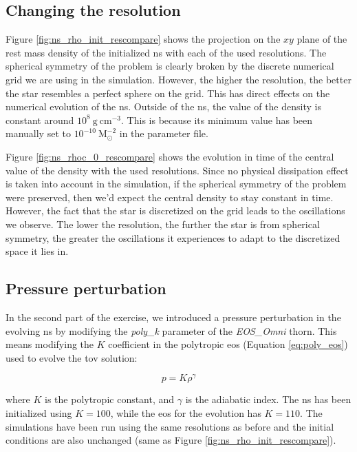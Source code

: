 \documentclass[11pt, a4paper]{article}
\begin{document}
\subsection{Changing the resolution}

Figure \ref{fig:ns_rho_init_rescompare} shows the projection on the \(xy\) plane of the rest mass density of the initialized \acrshort{ns} with each of the used resolutions. The spherical symmetry of the problem is clearly broken by the discrete numerical grid we are using in the simulation. However, the higher the resolution, the better the star resembles a perfect sphere on the grid. This has direct effects on the numerical evolution of the \acrshort{ns}. Outside of the \acrshort{ns}, the value of the density is constant around \(10^{8}\ \mathrm{g\ cm^{-3}}\). This is because its minimum value has been manually set to \(10^{-10}\ \mathrm{M_\odot^{-2}}\) in the parameter file.

Figure \ref{fig:ns_rhoc_0_rescompare} shows the evolution in time of the central value of the density with the used resolutions. Since no physical dissipation effect is taken into account in the simulation, if the spherical symmetry of the problem were preserved, then we'd expect the central density to stay constant in time. However, the fact that the star is discretized on the grid leads to the oscillations we observe. The lower the resolution, the further the star is from spherical symmetry, the greater the oscillations it experiences to adapt to the discretized space it lies in.

\subsection{Pressure perturbation}

In the second part of the exercise, we introduced a pressure perturbation in the evolving \acrshort{ns} by modifying the \textit{poly\_k} parameter of the \textit{EOS\_Omni} thorn. This means modifying the \(K\) coefficient in the polytropic \acrfull{eos} (Equation \ref{eq:poly_eos}) used to evolve the \acrshort{tov} solution:

\begin{equation} \label{eq:poly_eos}
    p = K \rho^\gamma
\end{equation}

\noindent
where \(K\) is the polytropic constant, and \(\gamma\) is the adiabatic index. The \acrlong{ns} has been initialized using \(K = 100\), while the \acrshort{eos} for the evolution has \(K = 110\). The simulations have been run using the same resolutions as before and the initial conditions are also unchanged (same as Figure \ref{fig:ns_rho_init_rescompare}).
\end{document}

